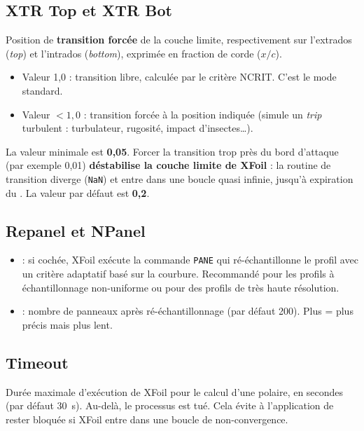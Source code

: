 \subsection{XTR Top et XTR Bot}

Position de \textbf{transition forcée} de la couche limite,
respectivement sur l'extrados (\emph{top}) et l'intrados
(\emph{bottom}), exprimée en fraction de corde ($x/c$).

\begin{itemize}
    \item Valeur 1{,}0 : transition libre, calculée par le critère
        NCRIT. C'est le mode standard.
    \item Valeur $<1{,}0$ : transition forcée à la position indiquée
        (simule un \emph{trip} turbulent : turbulateur, rugosité,
        impact d'insectes\dots).
\end{itemize}

\begin{important}
La valeur minimale est \textbf{0{,}05}. Forcer la transition trop
près du bord d'attaque (par exemple 0{,}01) \textbf{déstabilise la
couche limite de XFoil} : la routine de transition diverge
(\texttt{NaN}) et entre dans une boucle quasi infinie, jusqu'à
expiration du . La valeur par défaut est
\textbf{0{,}2}.
\end{important}

\subsection{Repanel et NPanel}

\begin{itemize}
    \item {} : si cochée, XFoil exécute la commande
        \texttt{PANE} qui ré-échantillonne le profil avec un
        critère adaptatif basé sur la courbure. Recommandé pour
        les profils à échantillonnage non-uniforme ou pour des
        profils de très haute résolution.
    \item {} : nombre de panneaux après ré-échantillonnage
        (par défaut 200). Plus = plus précis mais plus lent.
\end{itemize}

\subsection{Timeout}

Durée maximale d'exécution de XFoil pour le calcul d'une polaire,
en secondes (par défaut 30~s). Au-delà, le processus est tué.
Cela évite à l'application de rester bloquée si XFoil entre dans
une boucle de non-convergence.

